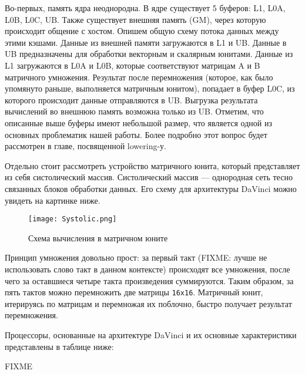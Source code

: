 Во-первых, память ядра неоднородна. В ядре существует 5 буферов:
L1, L0A, L0B, L0C, UB. Также существует внешняя память (GM), через которую
происходит общение с хостом. Опишем общую схему потока данных между этими кэшами.
Данные из внешней памяти загружаются в L1 и UB. Данные в UB предназначены для
обработки векторным и скалярным юнитами. Данные из L1 загружаются в L0A и L0B,
которые соответствуют матрицам A и B матричного умножения. Результат после
перемножения (которое, как было упомянуто раньше, выполняется матричным юнитом),
попадает в буфер L0C, из которого происходит данные отправляются в UB. Выгрузка
результата вычислений во внешнюю память возможна только из UB. Отметим, что
описанные выше буферы имеют небольшой размер, что является одной из основных
проблематик нашей работы. Более подробно этот вопрос будет рассмотрен в главе,
посвященной lowering-у.

Отдельно стоит рассмотреть устройство матричного юнита, который представляет
из себя систолический массив. Систолический массив --- однородная сеть тесно
связанных блоков обработки данных. Его схему для архитектуры DaVinci можно
увидеть на картинке ниже. 

\begin{figure}[h!]
    \centering
    \texttt{[image: Systolic.png]}
    \caption{Схема вычисления в матричном юните}
\end{figure}

Принцип умножения довольно прост: за первый такт (FIXME: лучше не использовать
слово такт в данном контексте) происходят все умножения,
после чего за оставшиеся четыре такта произведения суммируются. Таким
образом, за пять тактов можно перемножить две матрицы \texttt{16x16}.
Матричный юнит, итерируясь по матрицам и перемножая их поблочно, быстро
получает результат перемножения.

Процессоры, основанные на архитектуре DaVinci и их основные характеристики
представлены в таблице ниже:

FIXME

\newpage
